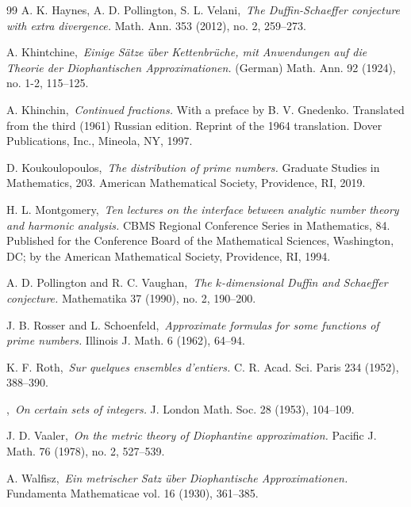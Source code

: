 \documentclass[12pt]{amsart}
\numberwithin{equation}{section}
\theoremstyle{definition}
\theoremstyle{remark}
\begin{document}
\begin{thebibliography}{99}
	A. K. Haynes, A. D.  Pollington, S. L. Velani,\,
	{\it The Duffin-Schaeffer conjecture with extra divergence.} 
	Math. Ann. 353 (2012), no. 2, 259--273.
	
	A. Khintchine,\,
	{\it Einige S\"atze \"uber Kettenbrüche, mit Anwendungen auf die Theorie der Diophantischen Approximationen.} (German) 
	Math. Ann. 92 (1924), no. 1-2, 115--125. 
	
	
	A. Khinchin,\,
	{\it Continued fractions.} With a preface by B. V. Gnedenko. Translated from the third (1961) Russian edition. Reprint of the 1964 translation. Dover Publications, Inc., Mineola, NY, 1997.
	
	D. Koukoulopoulos,\,
	{\it The distribution of prime numbers.} Graduate Studies in Mathematics, 203. American Mathematical Society, Providence, RI, 2019.
	
	H. L. Montgomery,\,
	{\it Ten lectures on the interface between analytic number theory and harmonic analysis.}
	CBMS Regional Conference Series in Mathematics, 84. 
	Published for the Conference Board of the Mathematical Sciences, Washington, DC; 
	by the American Mathematical Society, Providence, RI, 1994. 
	
	A. D. Pollington and R. C. Vaughan,\, 
	{\it  The $k$-dimensional Duffin and Schaeffer conjecture.} Mathematika 37 (1990), no. 2, 190--200. 
	
	
	 J. B. Rosser and L. Schoenfeld,\,
	{\it Approximate formulas for some functions of prime numbers.}
	Illinois J. Math. 6 (1962), 64--94.
	
	 K. F. Roth,\,
	{\it Sur quelques ensembles d'entiers.} 
	C. R. Acad. Sci. Paris 234 (1952), 388--390.
	
	\bysame,\,
	{\it On certain sets of integers.}
	J. London Math. Soc. 28 (1953), 104--109.
	
	J. D. Vaaler,\,
	{\it On the metric theory of Diophantine approximation.}
	Pacific J. Math. 76 (1978), no. 2, 527--539. 
	 
	A. Walfisz,\,
	{\it Ein metrischer Satz über Diophantische Approximationen.}
	Fundamenta Mathematicae vol. 16 (1930), 361--385.
\end{thebibliography}
\end{document}
